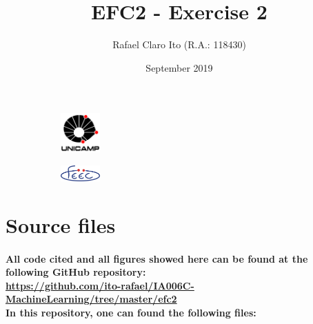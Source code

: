 \documentclass[a4paper]{article}    %
\begin{document}
\begin{figure}
    \centering
    \begin{subfigure}{0.45\textwidth}
        \centering
        \includegraphics[width=1.5cm]{unicamp}
        \label{fig:unicamp}
    \end{subfigure}
    \hfill
    \begin{subfigure}{0.45\textwidth}
        \centering
        \includegraphics[width=1.5cm]{feec}
        \label{fig:feec}
    \end{subfigure}
\end{figure}

\title{EFC2 - Exercise 2}
\author{Rafael Claro Ito (R.A.: 118430)}
\date{September 2019}
\maketitle
\newpage

\section{Source files}

\paragraph{All code cited and all figures showed here can be found at the following GitHub repository:\\
\url{https://github.com/ito-rafael/IA006C-MachineLearning/tree/master/efc2}\\
In this repository, one can found the following files:\\}
\end{document}

